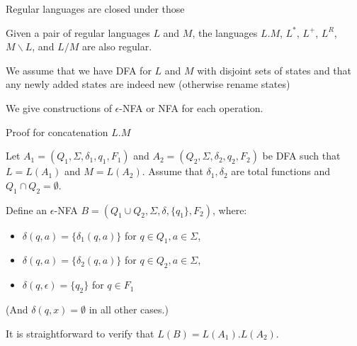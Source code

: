 \documentclass[handout]{beamer}
\begin{document}
\begin{frame}{Regular languages are closed under those}

    \begin{theorem}
        Given a pair of regular languages $L$ and $M$, the languages $L.M$, $L^*$, $L^+$, $L^R$, $M\backslash L$, and $L/M$ are also regular.
    \end{theorem}

    We assume that we have DFA for $L$ and $M$ with disjoint sets of states and that any newly added states are indeed new (otherwise rename states)

    We give constructions of $\epsilon$-NFA or NFA for each operation.

\end{frame}


\begin{frame}{Proof for concatenation $L.M$}

    Let $A_1=(Q_1,\Sigma, \delta_1,q_1,F_1)$ and $A_2=(Q_2,\Sigma, \delta_2,q_2,F_2)$ be DFA such that $L=L(A_1)$ and $M=L(A_2)$. Assume that $\delta_1,\delta_2$ are total functions and $Q_1\cap Q_2=\emptyset$.
    
    Define an $\epsilon$-NFA $B=(Q_1\cup Q_2,\Sigma,\delta,\{q_1\},F_2)$, where:
    \begin{itemize}
        \item $\delta(q,a)=\{\delta_1(q,a)\}$ for $q\in Q_1,a\in\Sigma$,
        \item $\delta(q,a)=\{\delta_2(q,a)\}$ for $q\in Q_2,a\in\Sigma$,
        \item $\delta(q,\epsilon)=\{q_2\}$ for $q\in F_1$
    \end{itemize}
    (And $\delta(q,x)=\emptyset$ in all other cases.)
    
    It is straightforward to verify that $L(B)=L(A_1).L(A_2)$.\hfill\qedsymbol
    
\end{frame}
\end{document}
